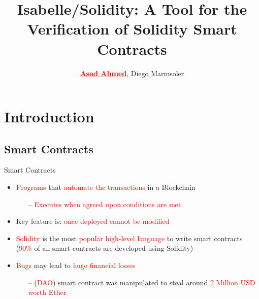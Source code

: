 \documentclass[aspectratio=169]{beamer}
\title{Isabelle/Solidity: A Tool for the Verification of Solidity Smart Contracts}
\author{ \textcolor{red}{\textbf{\underline{Asad Ahmed}}}, Diego Marmsoler}
\institute
{
  Department of Computer Science\\
  University of Exeter
}
\date{\DTMdisplaydate{2025}{05}{04}{-1}}
\begin{document}
\begin{frame}
\maketitle
\bigskip
\bigskip
\end{frame}

\frame{\tableofcontents}

\section{Introduction}
\frame{\tableofcontents[currentsection]}
%
\subsection{Smart Contracts}
\begin{frame}{Smart Contracts}

 \begin{itemize}

\item \textcolor{red}{Programs} that \textcolor{red}{automate the transactions} in a Blockchain
\begin{itemize}
\item[--] \textcolor{red}{Executes when agreed upon conditions are met}
\end{itemize}
\item Key feature is: \textcolor{red}{once deployed cannot be modified}
\item \textcolor{red}{Solidity} is the most \textcolor{red}{popular high-level language} to write smart contracts (\textcolor{red}{90\%} of all smart contracts are developed using Solidity)
\item \textcolor{red}{Bugs} may lead to \textcolor{red}{huge financial losses}
\begin{itemize}
\item[--] (\textcolor{red}{DAO}) smart contract was manipulated to steal around \textcolor{red}{2 Million USD worth Ether}
\end{itemize}
\end{itemize}
\end{frame}
%
\end{document}
